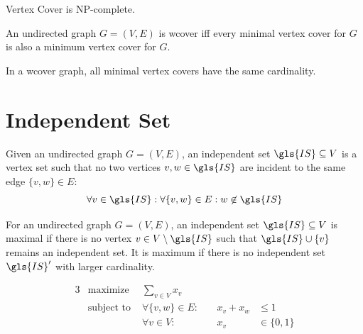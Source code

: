 
\begin{theorem}
  Vertex Cover is NP-complete. \cite{karp_np_complete}
\end{theorem}


\begin{definition}
  \label{def:well_covered}
  An undirected graph \(G=(V,E)\) is \gls{wcover} iff every minimal
  vertex cover for \(G\) is also a minimum vertex cover for \(G\).
  \cite{graph_well_covered}
\end{definition}


\begin{theorem}
  \label{thm:well_covered_vertex_cover}
  In a \gls{wcover} graph, all minimal vertex covers have the same
  cardinality. \cite{graph_well_covered}
\end{theorem}

\section{Independent Set}


\begin{definition}
  \label{def:independent_set}
  Given an undirected graph \(G=(V,E)\), an independent set
  \(\gls{IS} \subseteq V\) is a vertex set such that no two
  vertices \(v,w \in \gls{IS}\) are incident to the same edge 
  \(\{v,w\} \in E\):
  \[
    \forall v \in \gls{IS}:
    \forall \{v,w\} \in E:
    w \not\in \gls{IS}
  \]
\end{definition}


\begin{definition}
  \label{def:max_independent_set}
  For an undirected graph \(G=(V,E)\), an independent set
  \(\gls{IS}\subseteq V\) is maximal if there is no vertex
  \(v \in V\setminus \gls{IS}\) such that
  \(\gls{IS} \cup \{v\}\) remains an independent set. It is
  maximum if there is no independent set \(\gls{IS}'\) with
  larger cardinality.
\end{definition}


\begin{problem}
  \begin{alignat*}{3}
    &\text{maximize } & \sum\limits_{v \in V} x_v \\
    &\text{subject to } & \forall \{v,w\} \in E : &~& x_v + x_w &\leq 1 \\
    && \forall v \in V : &~& x_v &\in \{0,1\}
  \end{alignat*}
\end{problem}

